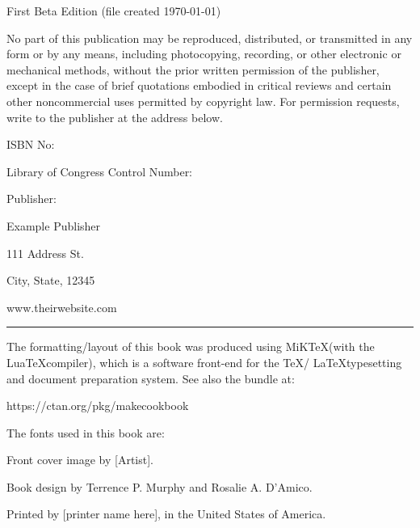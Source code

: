 \pagestyle{empty}
\MyTitlePage{} %

\begin{CopyrightPage}
	{
	First Beta Edition (file created \today ) \par
	\CopyrightInfo{}\par

	No part of this publication may be reproduced, distributed, or transmitted in any form or by any means,
	including photocopying, recording, or other electronic or mechanical methods, without the prior written
	permission of the publisher, except in the case of brief quotations embodied in critical reviews and
	certain other noncommercial uses permitted by copyright law. For permission requests, write to the
	publisher at the address below. \par
	\vspace{5pt}
	ISBN No: {}\par
	Library of Congress Control Number: {} \par
	\vspace{5pt}
	Publisher: \par
	Example Publisher\par
	111 Address St.\par
	City, State, 12345\par
	www.theirwebsite.com

	\vspace{5pt}
	\hrule
	\vspace{5pt}
	The formatting/layout of this book was produced using MiK\TeX\space (with the Lua\TeX\space compiler),
	which is a software front-end for the \TeX\space / \LaTeX\space typesetting and document preparation
	system.  See also the  bundle at:

	\quad https://ctan.org/pkg/makecookbook

	\vspace{5pt}
	The fonts used in this book are:\par
	\vspace{6pt}
	\ColophonFonts{}
	\vspace{5pt}
	Front cover image by [Artist].\par
	Book design by Terrence P. Murphy and Rosalie A. D'Amico.\par
	Printed by [printer name here], in the United States of America. \par
	}
\end{CopyrightPage}  %

